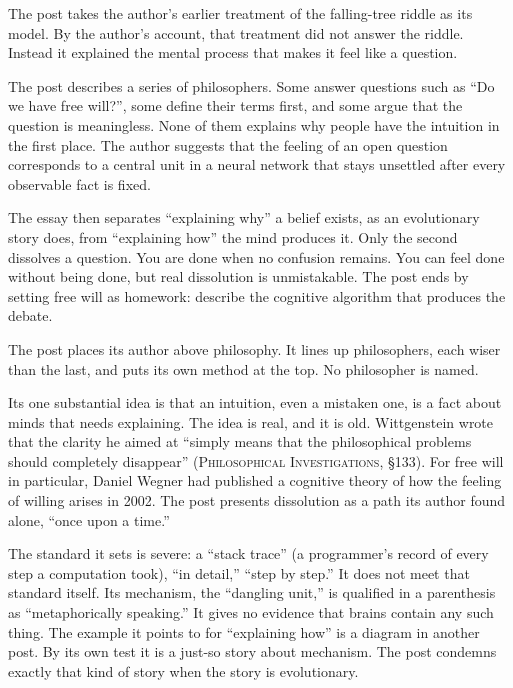 \begin{afterword}
\summaryhead

The post takes the author's earlier treatment of the falling-tree riddle as its model. By the author's account, that treatment did not answer the riddle. Instead it explained the mental process that makes it feel like a question.

The post describes a series of philosophers. Some answer questions such as ``Do we have free will?'', some define their terms first, and some argue that the question is meaningless. None of them explains why people have the intuition in the first place. The author suggests that the feeling of an open question corresponds to a central unit in a neural network that stays unsettled after every observable fact is fixed.

The essay then separates ``explaining why'' a belief exists, as an evolutionary story does, from ``explaining how'' the mind produces it. Only the second dissolves a question. You are done when no confusion remains. You can feel done without being done, but real dissolution is unmistakable. The post ends by setting free will as homework: describe the cognitive algorithm that produces the debate.

\responsehead

The post places its author above philosophy. It lines up philosophers, each wiser than the last, and puts its own method at the top. No philosopher is named.

Its one substantial idea is that an intuition, even a mistaken one, is a fact about minds that needs explaining. The idea is real, and it is old. Wittgenstein wrote that the clarity he aimed at ``simply means that the philosophical problems should completely disappear'' (\textsc{Philosophical Investigations}, §133). For free will in particular, Daniel Wegner had published a cognitive theory of how the feeling of willing arises in 2002. The post presents dissolution as a path its author found alone, ``once upon a time.''

The standard it sets is severe: a ``stack trace'' (a programmer's record of every step a computation took), ``in detail,'' ``step by step.'' It does not meet that standard itself. Its mechanism, the ``dangling unit,'' is qualified in a parenthesis as ``metaphorically speaking.'' It gives no evidence that brains contain any such thing. The example it points to for ``explaining how'' is a diagram in another post. By its own test it is a just-so story about mechanism. The post condemns exactly that kind of story when the story is evolutionary.


\end{afterword}
